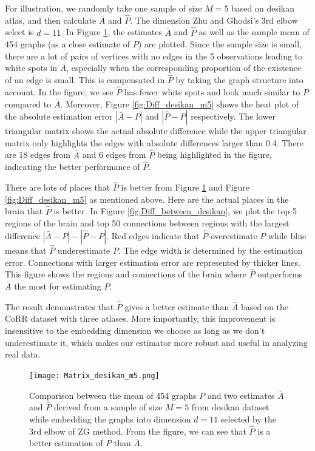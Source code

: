 \documentclass[a4paper]{article}
\begin{document}
For illustration, we randomly take one sample of size $M=5$ based on desikan atlas, and then calculate $\bar{A}$ and $\hat{P}$. The dimension Zhu and Ghodsi's 3rd elbow select is $d=11$. In Figure \ref{fig:Matrix_desikan_m5}, the estimates $\bar{A}$ and $\hat{P}$ as well as the sample mean of 454 graphs (as a close estimate of $P$) are plotted. Since the sample size is small, there are a lot of pairs of vertices with no edges in the 5 observations leading to white spots in $\bar{A}$, especially when the corresponding proportion of the existence of an edge is small. This is compensated in $\hat{P}$ by taking the graph structure into account. In the figure, we see $\hat{P}$ has fewer white spots and look much similar to $P$ compared to $\bar{A}$. Moreover, Figure \ref{fig:Diff_desikan_m5} shows the heat plot of the absolute estimation error $|\bar{A} - P|$ and $|\hat{P}-P|$ respectively. The lower triangular matrix shows the actual absolute difference while the upper triangular matrix only highlights the edges with absolute differences larger than 0.4. There are 18 edges from $\bar{A}$ and 6 edges from $\hat{P}$ being highlighted in the figure, indicating the better performance of $\hat{P}$.

There are lots of places that $\hat{P}$ is better from Figure \ref{fig:Matrix_desikan_m5} and Figure \ref{fig:Diff_desikan_m5} as mentioned above. Here are the actual places in the brain that $\hat{P}$ is better. In Figure \ref{fig:Diff_between_desikan}, we plot the top 5 regions of the brain and top 50 connections between regions with the largest difference $|\bar{A} - P| - |\hat{P} - P|$. Red edges indicate that $\hat{P}$ overestimate $P$ while blue means that $\hat{P}$ underestimate $P$. The edge width is determined by the estimation error. Connections with larger estimation error are represented by thicker lines. This figure shows the regions and connections of the brain where $\hat{P}$ outperforms $\bar{A}$ the most for estimating $P$.

The result demonstrates that $\hat{P}$ gives a better estimate than $\bar{A}$ based on the CoRR dataset with three atlases. 
More importantly, this improvement is insensitive to the embedding dimension we choose as long as we don't underestimate it, which makes our estimator more robust and useful in analyzing real data.

\begin{figure}[!htb]
\centering
\texttt{[image: Matrix\_desikan\_m5.png]}
\caption{Comparison between the mean of 454 graphs $P$ and two estimates $\bar{A}$ and $\hat{P}$ derived from a sample of size $M=5$ from desikan dataset while embedding the graphs into dimension $d=11$ selected by the 3rd elbow of ZG method. From the figure, we can see that $\hat{P}$ is a better estimation of $P$ than $\bar{A}$.}
\label{fig:Matrix_desikan_m5}
\end{figure}
\end{document}

